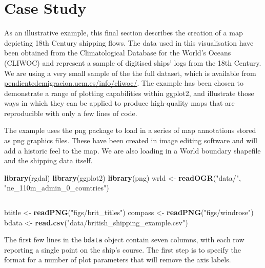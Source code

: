 \documentclass[]{article}
\newenvironment{Shaded}{}{}
\newcommand{\KeywordTok}[1]{\textcolor[rgb]{0.00,0.44,0.13}{\textbf{{#1}}}}
\newcommand{\StringTok}[1]{\textcolor[rgb]{0.25,0.44,0.63}{{#1}}}
\newcommand{\NormalTok}[1]{{#1}}
\begin{document}
\section{Case Study}
As an illustrative example, this final section describes the creation of a map depicting 18th Century shipping flows. The data used in this visualisation have been obtained from the Climatological Database for the World's Oceans (CLIWOC) and
represent a sample of digitised ships' logs from the 18th Century.
We are using a very small sample of the the full dataset, which is
available
from\\\href{http://pendientedemigracion.ucm.es/info/cliwoc/}{pendientedemigracion.ucm.es/info/cliwoc/}.
The example has been chosen to demonstrate a range of plotting capabilities
within ggplot2, and illustrate those ways in which they can be applied to produce
high-quality maps that are reproducible with only a few lines of code.

The example uses the png package to load in a series of map
annotations stored as png graphics files. These have been created in image editing software and will add a historic feel to the map. We are also loading in a World boundary
shapefile and the shipping data itself.

\begin{Shaded}
\begin{Highlighting}[]
\KeywordTok{library}\NormalTok{(rgdal)}
\KeywordTok{library}\NormalTok{(ggplot2)}
\KeywordTok{library}\NormalTok{(png)}
\NormalTok{wrld <- }\KeywordTok{readOGR}\NormalTok{(}\StringTok{"data/"}\NormalTok{, }\StringTok{"ne_110m_admin_0_countries"}\NormalTok{)}
\end{Highlighting}
\end{Shaded}
\begin{verbatim}

\end{verbatim}
\begin{Shaded}
\begin{Highlighting}[]
\NormalTok{btitle <- }\KeywordTok{readPNG}\NormalTok{(}\StringTok{"figs/brit_titles"}\NormalTok{)}
\NormalTok{compass <- }\KeywordTok{readPNG}\NormalTok{(}\StringTok{"figs/windrose"}\NormalTok{)}
\NormalTok{bdata <- }\KeywordTok{read.csv}\NormalTok{(}\StringTok{"data/british_shipping_example.csv"}\NormalTok{)}
\end{Highlighting}
\end{Shaded}

The first few lines in the \texttt{bdata} object contain seven columns, with each row reporting a single point on the
ship's course. The first step is to specify the format for a number of plot parameters that will remove the axis labels.
\end{document}
